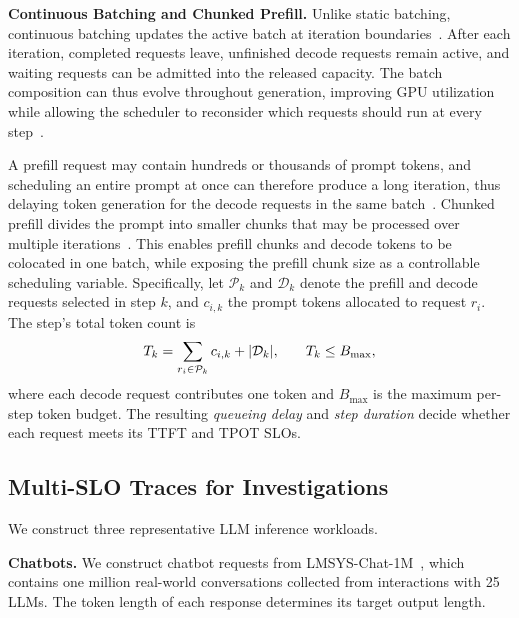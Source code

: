\textbf{Continuous Batching and Chunked Prefill.}
Unlike static batching, continuous batching updates the active batch at iteration boundaries~\cite{yu2022orca}.
After each iteration, completed requests leave, unfinished decode requests remain active, and waiting requests can be admitted into the released capacity.
The batch composition can thus evolve throughout generation, improving GPU utilization while allowing the scheduler to reconsider which requests should run at every step~\cite{wu2026fastserve}.

A prefill request may contain hundreds or thousands of prompt tokens, and scheduling an entire prompt at once can therefore produce a long iteration, thus delaying token generation for the decode requests in the same batch~\cite{du2026ecoserve}.
Chunked prefill divides the prompt into smaller chunks that may be processed over multiple iterations~\cite{agrawal2024sarathi}.
This enables prefill chunks and decode tokens to be colocated in one batch, while exposing the prefill chunk size as a controllable scheduling variable.
Specifically, let $\mathcal{P}_k$ and $\mathcal{D}_k$ denote the prefill and decode requests selected in step $k$, and $c_{i,k}$ the prompt tokens allocated to request $r_i$.
The step's total token count is
\begin{equation}
  \small
  T_k = \sum_{r_i \in \mathcal{P}_k} c_{i,k}
  + \lvert\mathcal{D}_k\rvert,
  \qquad T_k \leq B_{\max},
  \label{eq:step-token-budget}
\end{equation}
where each decode request contributes one token and $B_{\max}$ is the maximum per-step token budget.
The resulting \textit{queueing delay} and \textit{step duration} decide whether each request meets its TTFT and TPOT SLOs.



\subsection{Multi-SLO Traces for Investigations}
\label{subsec:motivation-trace}

We construct three representative LLM inference workloads.

\textbf{Chatbots.}
We construct chatbot requests from LMSYS-Chat-1M~\cite{zheng2024lmsyschat}, which contains one million real-world conversations collected from interactions with 25 LLMs.
The token length of each response determines its target output length.

